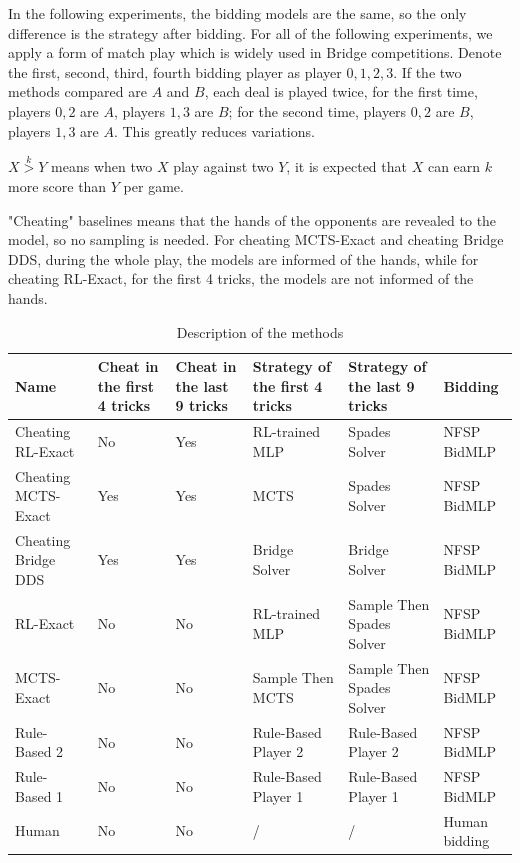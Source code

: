 \documentclass{article}
\begin{document}
In the following experiments, the bidding models are the same, so the only difference is the strategy after bidding. For all of the following experiments, we apply a form of match play which is widely used in Bridge competitions. Denote the first, second, third, fourth bidding player as player $0,1,2,3$. If the two methods compared are $A$ and $B$, each deal is played twice, for the first time, players $0,2$ are $A$, players $1,3$ are $B$; for the second time, players $0,2$ are $B$, players $1,3$ are $A$. This greatly reduces variations.

$X \overset{k}{>} Y$  means when two $X$ play against two $Y$,
it is expected that $X$ can earn $k$ more score than $Y$ per game. 

"Cheating" baselines means that the hands of the opponents are revealed to the model, so no sampling is needed. For cheating MCTS-Exact and cheating Bridge DDS, during the whole play, the models are informed of the hands, while for cheating RL-Exact, for the first 4 tricks, the models are not informed of the hands.

\begin{table}[!htbp]
\centering
\small
\caption{Description of the methods}
\label{tab:example}
\begin{tabularx}{\textwidth}{
  >{\centering\arraybackslash}X
  >{\centering\arraybackslash}X
  >{\centering\arraybackslash}X
  >{\centering\arraybackslash}X
  >{\centering\arraybackslash}X
  >{\centering\arraybackslash}X
}
\toprule
\textbf{Name} & 
\textbf{Cheat in the first 4 tricks} & 
\textbf{Cheat in the last 9 tricks} & 
\textbf{Strategy of the first 4 tricks} & 
\textbf{Strategy of the last 9 tricks} & 
\textbf{Bidding} \\
\midrule
Cheating RL-Exact   & No  & Yes & RL-trained MLP             & Spades Solver & \makecell{NFSP\\BidMLP} \\
Cheating MCTS-Exact & Yes & Yes & MCTS                 & Spades Solver & \makecell{NFSP\\BidMLP} \\
Cheating Bridge DDS & Yes & Yes & Bridge Solver        & Bridge Solver & \makecell{NFSP\\BidMLP} \\
RL-Exact            & No  & No  & RL-trained MLP             & Sample Then Spades Solver & \makecell{NFSP\\BidMLP} \\
MCTS-Exact          & No  & No  & Sample Then MCTS     & Sample Then Spades Solver & \makecell{NFSP\\BidMLP} \\
Rule-Based 2        & No  & No  & Rule-Based Player 2  & Rule-Based Player 2 & \makecell{NFSP\\BidMLP} \\
Rule-Based 1        & No  & No  & Rule-Based Player 1  & Rule-Based Player 1 & \makecell{NFSP\\BidMLP} \\
Human             & No  & No  & /  & / & Human bidding \\
\bottomrule
\end{tabularx}
\end{table}
\FloatBarrier
\end{document}
